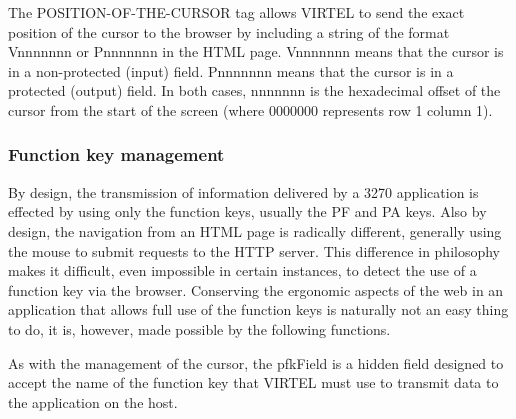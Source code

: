 \documentclass[letterpaper,10pt,english]{sphinxmanual}
\begin{document}
The POSITION-OF-THE-CURSOR tag allows VIRTEL to send the exact position of the cursor to the browser by including a
string of the format Vnnnnnnn or Pnnnnnnn in the HTML page. Vnnnnnnn means that the cursor is in a non-protected
(input) field. Pnnnnnnn means that the cursor is in a protected (output) field. In both cases, nnnnnnn is the
hexadecimal offset of the cursor from the start of the screen (where 0000000 represents row 1 column 1).

\begin{sphinxVerbatim}[commandchars=\\\{\}]
  
\end{sphinxVerbatim}


\subsubsection{Function key management}
\label{\detokenize{User_Guide:function-key-management}}

By design, the transmission of information delivered by a 3270 application is effected by using only the function keys,
usually the PF and PA keys. Also by design, the navigation from an HTML page is radically different, generally using the
mouse to submit requests to the HTTP server. This difference in philosophy makes it difficult, even impossible in
certain instances, to detect the use of a function key via the browser. Conserving the ergonomic aspects of the web in
an application that allows full use of the function keys is naturally not an easy thing to do, it is, however, made possible
by the following functions.
\label{\detokenize{User_Guide:v457ug-pfkfield}}

As with the management of the cursor, the pfkField is a hidden field designed to accept the name of the function key
that VIRTEL must use to transmit data to the application on the host.

\begin{sphinxVerbatim}[commandchars=\\\{\}]
   
\end{sphinxVerbatim}
\end{document}
